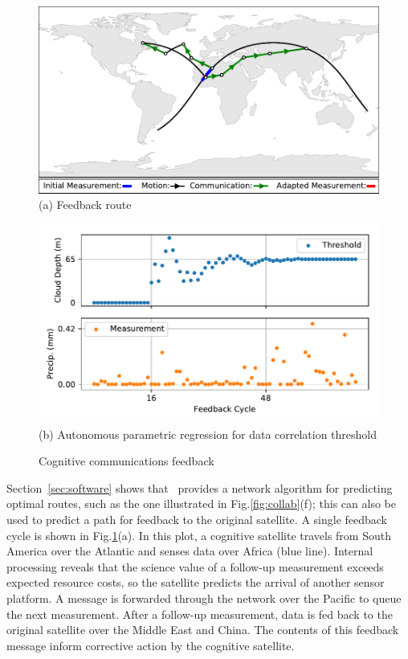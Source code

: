 \documentclass[conference]{IEEEtran}
\newcommand{\project}{{\sc{Collaborate}}~}
\begin{document}
\begin{figure}[b!]
  \begin{minipage}[b]{\linewidth}
    \begin{center}
      \includegraphics[width=\textwidth]{images/loop.pdf}
      {\footnotesize(a) Feedback route}
    \end{center}
  \end{minipage}
  \begin{minipage}[b]{\linewidth}
    \begin{center}
      \includegraphics[width=\textwidth]{images/regression.pdf}
      {\footnotesize(b) Autonomous parametric regression for data correlation
        threshold}
    \end{center}
  \end{minipage}
  \caption{Cognitive communications feedback}
  \label{fig:feedback}
\end{figure}

Section~\ref{sec:software} shows that \project provides a network algorithm for predicting optimal routes, such as the one illustrated in Fig.\ref{fig:collab}(f); this can also be used to predict a path for feedback to the original satellite.  A single feedback cycle is shown in Fig.\ref{fig:feedback}(a).  In this plot, a cognitive satellite travels from South America over the Atlantic and senses data over Africa (blue line).  Internal processing reveals that the science value of a follow-up measurement exceeds expected resource costs, so the satellite predicts the arrival of another sensor platform.  A message is forwarded through the network over the Pacific to queue the next measurement.  After a follow-up measurement, data is fed back to the original satellite over the Middle East and China.  The contents of this feedback message inform corrective action by the cognitive satellite.
\end{document}
